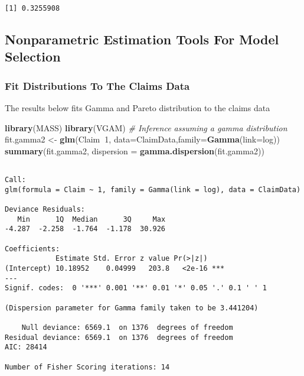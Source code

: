 \documentclass[]{book}
\newenvironment{Shaded}{\begin{snugshade}}{\end{snugshade}}
\newcommand{\KeywordTok}[1]{\textcolor[rgb]{0.13,0.29,0.53}{\textbf{#1}}}
\newcommand{\DataTypeTok}[1]{\textcolor[rgb]{0.13,0.29,0.53}{#1}}
\newcommand{\DecValTok}[1]{\textcolor[rgb]{0.00,0.00,0.81}{#1}}
\newcommand{\StringTok}[1]{\textcolor[rgb]{0.31,0.60,0.02}{#1}}
\newcommand{\CommentTok}[1]{\textcolor[rgb]{0.56,0.35,0.01}{\textit{#1}}}
\newcommand{\OperatorTok}[1]{\textcolor[rgb]{0.81,0.36,0.00}{\textbf{#1}}}
\newcommand{\NormalTok}[1]{#1}
\theoremstyle{definition}
\theoremstyle{definition}
\theoremstyle{definition}
\theoremstyle{remark}
\begin{document}
\begin{verbatim}
[1] 0.3255908
\end{verbatim}

\subsection{Nonparametric Estimation Tools For Model
Selection}\label{nonparametric-estimation-tools-for-model-selection}

\subsubsection{Fit Distributions To The Claims
Data}\label{fit-distributions-to-the-claims-data}

The results below fits Gamma and Pareto distribution to the claims data

\begin{Shaded}
\begin{Highlighting}[]
\KeywordTok{library}\NormalTok{(MASS)}
\KeywordTok{library}\NormalTok{(VGAM)}
\CommentTok{# Inference assuming a gamma distribution}
\NormalTok{fit.gamma2 <-}\StringTok{ }\KeywordTok{glm}\NormalTok{(Claim}\OperatorTok{~}\DecValTok{1}\NormalTok{, }\DataTypeTok{data=}\NormalTok{ClaimData,}\DataTypeTok{family=}\KeywordTok{Gamma}\NormalTok{(}\DataTypeTok{link=}\NormalTok{log)) }
\KeywordTok{summary}\NormalTok{(fit.gamma2, }\DataTypeTok{dispersion =} \KeywordTok{gamma.dispersion}\NormalTok{(fit.gamma2)) }
\end{Highlighting}
\end{Shaded}

\begin{verbatim}

Call:
glm(formula = Claim ~ 1, family = Gamma(link = log), data = ClaimData)

Deviance Residuals: 
   Min      1Q  Median      3Q     Max  
-4.287  -2.258  -1.764  -1.178  30.926  

Coefficients:
            Estimate Std. Error z value Pr(>|z|)    
(Intercept) 10.18952    0.04999   203.8   <2e-16 ***
---
Signif. codes:  0 '***' 0.001 '**' 0.01 '*' 0.05 '.' 0.1 ' ' 1

(Dispersion parameter for Gamma family taken to be 3.441204)

    Null deviance: 6569.1  on 1376  degrees of freedom
Residual deviance: 6569.1  on 1376  degrees of freedom
AIC: 28414

Number of Fisher Scoring iterations: 14
\end{verbatim}
\end{document}
